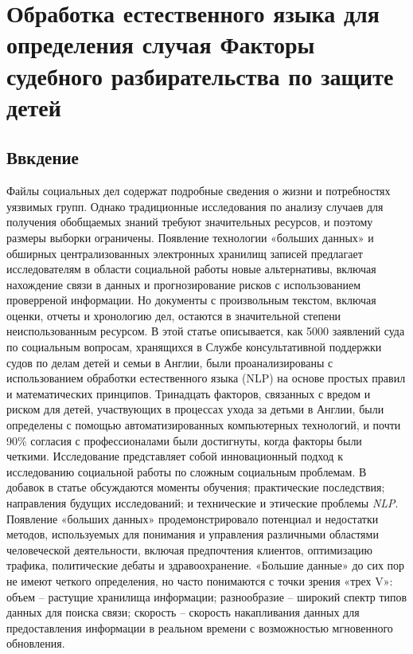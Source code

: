 \documentclass[a4paper,10pt]{article}
\begin{document}
    \section*{Обработка естественного языка для определения случая
    Факторы судебного разбирательства по защите детей}

    \subsection*{Ввкдение}
    \par
    Файлы социальных дел содержат подробные сведения о жизни и потребностях уязвимых групп. 
    Однако традиционные исследования по анализу случаев для получения обобщаемых знаний требуют значительных ресурсов, и поэтому размеры выборки ограничены. 
    Появление технологии «больших данных» и обширных централизованных электронных хранилищ записей предлагает исследователям в области социальной работы новые альтернативы, 
    включая нахождение связи в данных и прогнозирование рисков с использованием проверреной информации.
    Но документы с произвольным текстом, включая оценки, отчеты и хронологию дел, остаются в значительной степени неиспользованным ресурсом. 
    В этой статье описывается, как 5000 заявлений суда по социальным вопросам, хранящихся в Службе консультативной поддержки судов по делам детей и семьи в Англии, были проанализированы с использованием обработки естественного языка (NLP) на основе простых правил и математических принципов. 
    Тринадцать факторов, связанных с вредом и риском для детей, участвующих в процессах ухода за детьми в Англии, были определены с помощью автоматизированных компьютерных технологий, и почти 90\% согласия с профессионалами были достигнуты, когда факторы были четкими. 
    Исследование представляет собой инновационный подход к исследованию социальной работы по сложным социальным проблемам. 
    В добавок в статье обсуждаются моменты обучения; практические последствия; направления будущих исследований; и технические и этические проблемы \textit{NLP}. 
    Появление «больших данных» продемонстрировало потенциал и недостатки методов, используемых для понимания и управления различными областями человеческой деятельности, включая предпочтения клиентов, оптимизацию трафика, политические дебаты и здравоохранение. «Большие данные» до сих пор не имеют четкого определения, но часто понимаются с точки зрения «трех V»: 
        объем -- растущие хранилища информации; 
        разнообразие -- широкий спектр типов данных для поиска связи; 
        скорость -- скорость накапливания данных для предоставления информации в реальном времени с возможностью мгновенного обновления. 
\end{document}
